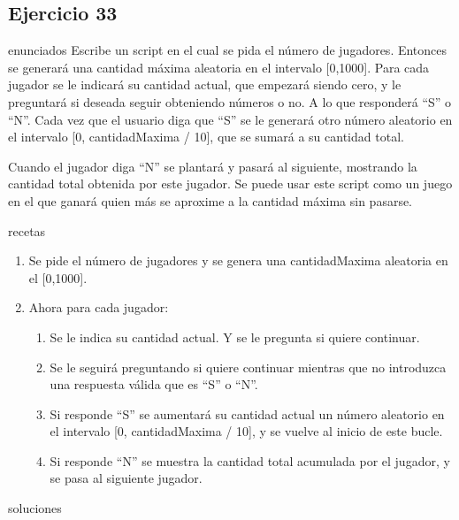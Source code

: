 \subsection{Ejercicio 33}
\def\parte{enunciados}
\ifx\capitulo\parte
Escribe un script en el cual se pida el número de jugadores. Entonces se generará una cantidad máxima aleatoria en el intervalo [0,1000]. Para cada jugador se le indicará su cantidad actual, que empezará siendo cero, y le preguntará si deseada seguir obteniendo números o no. A lo que responderá ``S'' o ``N''. Cada vez que el usuario diga que ``S'' se le generará otro número aleatorio en el intervalo [0, cantidadMaxima / 10], que se sumará a su cantidad total.

Cuando el jugador diga ``N'' se plantará y pasará al siguiente, mostrando la cantidad total obtenida por este jugador. Se puede usar este script como un juego en el que ganará quien más se aproxime a la cantidad máxima sin pasarse.
\fi

\def\parte{recetas}
\ifx\capitulo\parte
\begin{enumerate}
\item Se pide el número de jugadores y se genera una cantidadMaxima aleatoria en el [0,1000].
\item Ahora para cada jugador:
  \begin{enumerate}
  \item Se le indica su cantidad actual. Y se le pregunta si quiere continuar.
  \item Se le seguirá preguntando si quiere continuar mientras que no introduzca una respuesta válida que es ``S'' o ``N''.
  \item Si responde ``S'' se aumentará su cantidad actual un número aleatorio en el intervalo [0, cantidadMaxima / 10], y se vuelve al inicio de este bucle.
  \item Si responde ``N'' se muestra la cantidad total acumulada por el jugador, y se pasa al siguiente jugador.
  \end{enumerate}
\end{enumerate}
\fi

\def\parte{soluciones}
\ifx\capitulo\parte

\fi

